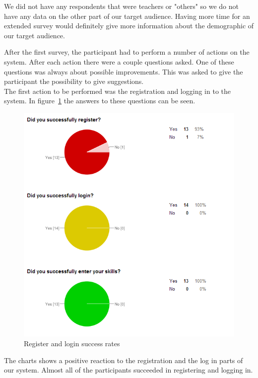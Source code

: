 We did not have any respondents that were teachers or "others" so we do not have any data on the other part of our target audience.
Having more time for an extended survey would definitely give more information about the demographic of our target audience.

After the first survey, the participant had to perform a number of actions on the system.
After each action there were a couple questions asked.
One of these questions was always about possible improvements.
This was asked to give the participant the possibility to give suggestions.\\
The first action to be performed was the registration and logging in to the system.
In figure~\ref{register_login_chart} the answers to these questions can be seen.\\
\begin{figure}[H]
    \centering
    \includegraphics[width=\textwidth]{images/register_login_chart}
    \caption{Register and login success rates}
    \label{register_login_chart}
\end{figure}

The charts shows a positive reaction to the registration and the log in parts of our system.
Almost all of the participants succeeded in registering and logging in.

